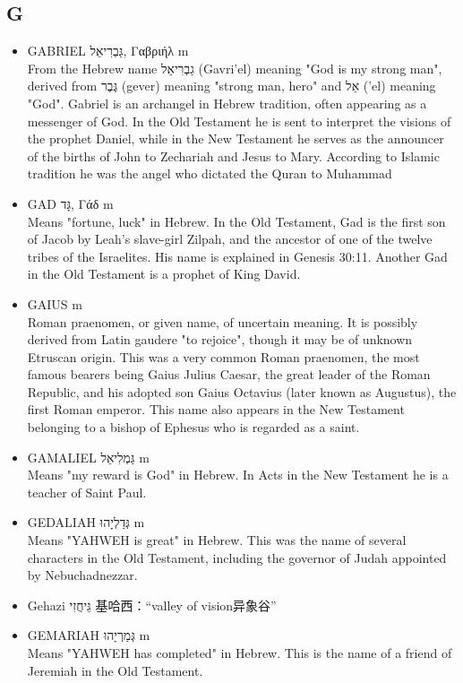 \subsection{G} 
\begin{itemize} 
\itemsep-.25em 
\item GABRIEL גַּבְרִיאֵל, Γαβριήλ m\\
From the Hebrew name גַבְרִיאֵל (Gavri'el) meaning "God is my strong man", derived from גֶּבֶר (gever) meaning "strong man, hero" and אֵל ('el) meaning "God". Gabriel is an archangel in Hebrew tradition, often appearing as a messenger of God. In the Old Testament he is sent to interpret the visions of the prophet Daniel, while in the New Testament he serves as the announcer of the births of John to Zechariah and Jesus to Mary. According to Islamic tradition he was the angel who dictated the Quran to Muhammad\
\item GAD גָּד, Γάδ m\\
Means "fortune, luck" in Hebrew. In the Old Testament, Gad is the first son of Jacob by Leah's slave-girl Zilpah, and the ancestor of one of the twelve tribes of the Israelites. His name is explained in Genesis 30:11. Another Gad in the Old Testament is a prophet of King David.
\item GAIUS m \\
Roman praenomen, or given name, of uncertain meaning. It is possibly derived from Latin gaudere "to rejoice", though it may be of unknown Etruscan origin. This was a very common Roman praenomen, the most famous bearers being Gaius Julius Caesar, the great leader of the Roman Republic, and his adopted son Gaius Octavius (later known as Augustus), the first Roman emperor. This name also appears in the New Testament belonging to a bishop of Ephesus who is regarded as a saint.
\item GAMALIEL גַּמְלִיאֵל m \\
Means "my reward is God" in Hebrew. In Acts in the New Testament he is a teacher of Saint Paul.
\item GEDALIAH גְּדַלְיָהוּ m \\
Means "YAHWEH is great" in Hebrew. This was the name of several characters in the Old Testament, including the governor of Judah appointed by Nebuchadnezzar.
\item Gehazi גֵּיחֲזִי 基哈西：“valley of vision异象谷”
\item GEMARIAH גְּמַרְיָהוּ m \\
Means "YAHWEH has completed" in Hebrew. This is the name of a friend of Jeremiah in the Old Testament.

\end{itemize}
